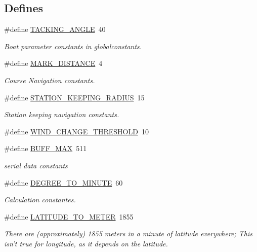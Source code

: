 \subsection*{\-Defines}
\begin{DoxyCompactItemize}
\item 
\#define \hyperlink{group__globalconstants_ga2cf0d7fd0783e401cdb0dc31e2179673}{\-T\-A\-C\-K\-I\-N\-G\-\_\-\-A\-N\-G\-L\-E}~40
\begin{DoxyCompactList}\small\item\em \-Boat parameter constants in globalconstants. \end{DoxyCompactList}\item 
\#define \hyperlink{group__globalconstants_ga19af76681fc030672f41555a55f8e8db}{\-M\-A\-R\-K\-\_\-\-D\-I\-S\-T\-A\-N\-C\-E}~4
\begin{DoxyCompactList}\small\item\em \-Course \-Navigation constants. \end{DoxyCompactList}\item 
\#define \hyperlink{group__globalconstants_ga90af33a69f96f733c581db0261bc1676}{\-S\-T\-A\-T\-I\-O\-N\-\_\-\-K\-E\-E\-P\-I\-N\-G\-\_\-\-R\-A\-D\-I\-U\-S}~15
\begin{DoxyCompactList}\small\item\em \-Station keeping navigation constants. \end{DoxyCompactList}\item 
\#define \hyperlink{group__globalconstants_ga0e751f6a929915f9b2ea482bc096d3ca}{\-W\-I\-N\-D\-\_\-\-C\-H\-A\-N\-G\-E\-\_\-\-T\-H\-R\-E\-S\-H\-O\-L\-D}~10
\item 
\#define \hyperlink{group__globalconstants_ga2c1c653e45c4962f05cb6341f359707d}{\-B\-U\-F\-F\-\_\-\-M\-A\-X}~511
\begin{DoxyCompactList}\small\item\em serial data constants \end{DoxyCompactList}\item 
\#define \hyperlink{group__globalconstants_gaa0fe8a3893ebea828d2bb49ef23e3530}{\-D\-E\-G\-R\-E\-E\-\_\-\-T\-O\-\_\-\-M\-I\-N\-U\-T\-E}~60
\begin{DoxyCompactList}\small\item\em \-Calculation constantes. \end{DoxyCompactList}\item 
\#define \hyperlink{group__globalconstants_ga334339ea1bc712a2689665192c02bfad}{\-L\-A\-T\-I\-T\-U\-D\-E\-\_\-\-T\-O\-\_\-\-M\-E\-T\-E\-R}~1855
\begin{DoxyCompactList}\small\item\em \-There are (approximately) 1855 meters in a minute of latitude everywhere; \-This isn't true for longitude, as it depends on the latitude. \end{DoxyCompactList}\item 

\end{DoxyCompactItemize}
